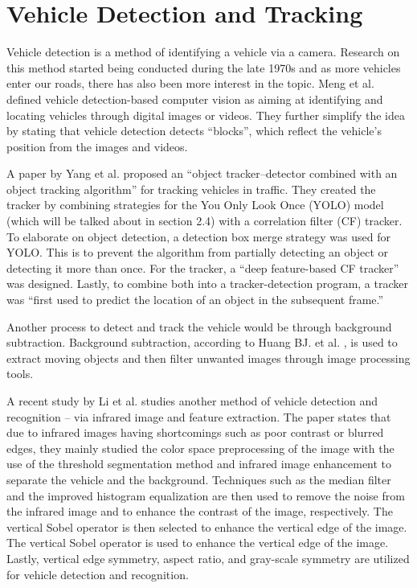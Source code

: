 \section{Vehicle Detection and Tracking}

	Vehicle detection is a method of identifying a vehicle via a camera. Research on this method started being conducted during the late 1970s \cite{NathDeb2012} and as more vehicles enter our roads, there has also been more interest in the topic. Meng et al. \citeyear{Meng_2020} defined vehicle detection-based computer vision as aiming at identifying and locating vehicles through digital images or videos. They further simplify the idea by stating that vehicle detection detects “blocks”, which reflect the vehicle’s position from the images and videos.

	A paper by Yang et al. \citeyear{yang_2020} proposed an “object tracker–detector combined with an object tracking algorithm” for tracking vehicles in traffic. They created the tracker by combining strategies for the You Only Look Once (YOLO) model (which will be talked about in section 2.4) with a correlation filter (CF) tracker. To elaborate on object detection, a detection box merge strategy was used for YOLO. This is to prevent the algorithm from partially detecting an object or detecting it more than once. For the tracker, a “deep feature-based CF tracker” was designed. Lastly, to combine both into a tracker-detection program, a tracker was “first used to predict the location of an object in the subsequent frame.”

	Another process to detect and track the vehicle would be through background subtraction. Background subtraction, according to Huang BJ. et al. \citeyear{Huang_2017}, is used to extract moving objects and then filter unwanted images through image processing tools. 
	
	A recent study by Li et al. \citeyear{li_2022} studies another method of vehicle detection and recognition – via infrared image and feature extraction. The paper states that due to infrared images having shortcomings such as poor contrast or blurred edges, they mainly studied the color space preprocessing of the image with the use of the threshold segmentation method and infrared image enhancement to separate the vehicle and the background. Techniques such as the median filter and the improved histogram equalization are then used to remove the noise from the infrared image and to enhance the contrast of the image, respectively. The vertical Sobel operator is then selected to enhance the vertical edge of the image. The vertical Sobel operator is used to enhance the vertical edge of the image. Lastly, vertical edge symmetry, aspect ratio, and gray-scale symmetry are utilized for vehicle detection and recognition.


